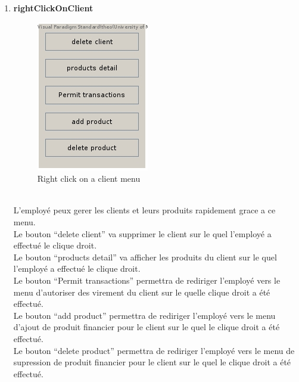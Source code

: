 \documentclass[../rapport.tex]{subfiles}
\begin{document}
\begin{enumerate}
\newpage
\item \textbf{rightClickOnClient} \\
		\begin{figure}[h!]
				\centering \includegraphics[scale=0.2]{ressources/photos_diagrammes/app2/gui/rightClickOnAClient.jpg}
				\caption{Right click on a client menu}
		\end{figure}
		\\
L'employé peux gerer les clients et leurs produits rapidement grace a ce menu.\\
Le bouton ``delete client'' va supprimer le client sur le quel l'employé a effectué le clique droit.\\
Le bouton ``products detail'' va afficher les produits du client sur le quel l'employé a effectué le clique droit.\\
Le bouton ``Permit transactions'' permettra de rediriger l'employé vers le menu d'autoriser des virement du client sur le quelle clique droit a été effectué.\\
Le bouton ``add product'' permettra de rediriger l'employé vers le menu d'ajout de produit financier pour le client sur le quel le clique droit a été effectué.\\
Le bouton ``delete product'' permettra de rediriger l'employé vers le menu de supression de produit financier pour le client sur le quel le clique droit a été effectué.\\


\end{enumerate}
\end{document}
